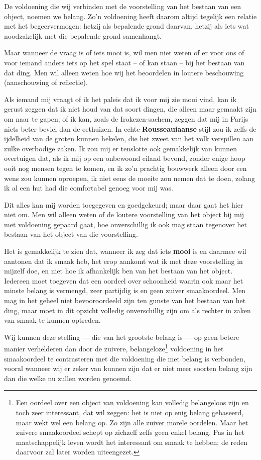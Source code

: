 De voldoening die wij verbinden met de voorstelling van het bestaan van een object, noemen we belang. Zo’n voldoening heeft daarom altijd tegelijk een relatie met het begeervermogen: hetzij als bepalende grond daarvan, hetzij als iets wat noodzakelijk met die bepalende grond samenhangt.

Maar wanneer de vraag is of iets mooi is, wil men niet weten of er voor ons of voor iemand anders iets op het spel staat -- of kan staan -- bij het bestaan van dat ding. Men wil alleen weten hoe wij het beoordelen in loutere beschouwing (aanschouwing of reflectie).

Als iemand mij vraagt of ik het paleis dat ik voor mij zie mooi vind, kan ik gerust zeggen dat ik niet houd van dat soort dingen, die alleen maar gemaakt zijn om naar te gapen; of ik kan, zoals de Irokezen-sachem, zeggen dat mij in Parijs niets beter beviel dan de eethuizen. In echte \textbf{Rousseauiaanse} stijl zou ik zelfs de ijdelheid van de groten kunnen hekelen, die het zweet van het volk verspillen aan zulke overbodige zaken. Ik zou mij er tenslotte ook gemakkelijk van kunnen overtuigen dat, als ik mij op een onbewoond eiland bevond, zonder enige hoop ooit nog mensen tegen te komen, en ik zo’n prachtig bouwwerk alleen door een wens zou kunnen oproepen, ik niet eens de moeite zou nemen dat te doen, zolang ik al een hut had die comfortabel genoeg voor mij was.

Dit alles kan mij worden toegegeven en goedgekeurd; maar daar gaat het hier niet om. Men wil alleen weten of de loutere voorstelling van het object bij mij met voldoening gepaard gaat, hoe onverschillig ik ook mag staan tegenover het bestaan van het object van die voorstelling.

Het is gemakkelijk te zien dat, wanneer ik zeg dat iets \textbf{mooi} is en daarmee wil aantonen dat ik smaak heb, het erop aankomt wat ik met deze voorstelling in mijzelf doe, en niet hoe ik afhankelijk ben van het bestaan van het object. Iedereen moet toegeven dat een oordeel over schoonheid waarin ook maar het minste belang is vermengd, zeer partijdig is en geen zuiver smaakoordeel. Men mag in het geheel niet bevooroordeeld zijn ten gunste van het bestaan van het ding, maar moet in dit opzicht volledig onverschillig zijn om als rechter in zaken van smaak te kunnen optreden.

Wij kunnen deze stelling --- die van het grootste belang is --- op geen betere manier verhelderen dan door de zuivere, belangeloze\footnote{Een oordeel over een object van voldoening kan volledig belangeloos zijn en toch zeer interessant, dat wil zeggen: het is niet op enig belang gebaseerd, maar wekt wel een belang op. Zo zijn alle zuiver morele oordelen. Maar het zuivere smaakoordeel schept op zichzelf zelfs geen enkel belang. Pas in het maatschappelijk leven wordt het interessant om smaak te hebben; de reden daarvoor zal later worden uiteengezet.} voldoening in het smaakoordeel te contrasteren met die voldoening die met belang is verbonden, vooral wanneer wij er zeker van kunnen zijn dat er niet meer soorten belang zijn dan die welke nu zullen worden genoemd.

